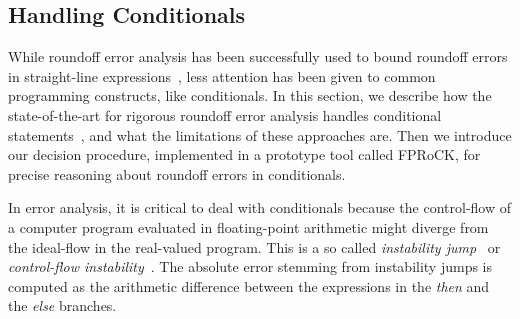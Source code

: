 %
%

%
%
%
%
\subsection{Handling Conditionals}
\label{conditionals}
%
While roundoff error analysis has been successfully used to bound roundoff errors in straight-line expressions~\cite{darulova2018daisy,2015_fm_sjrg,solovyev2018rigorous,rosa,precisa,gappa,fluctuat}, less attention has been given to common programming constructs, like conditionals.
%
In this section, we describe how the state-of-the-art for rigorous roundoff error analysis handles conditional statements~\cite{precisa, fluctuat, darulova2018daisy}, and what the limitations of these approaches are.
%
Then we introduce our decision procedure, implemented in a prototype tool called FPRoCK, for precise reasoning about roundoff errors in conditionals.
%

In error analysis, it is critical to deal with conditionals because the control-flow of a computer program evaluated in floating-point arithmetic might diverge from the ideal-flow in the real-valued program.
%
%
This is a so called \emph{instability jump}~\cite{satire} or \emph{control-flow instability}~\cite{unstable}.
%
The absolute error stemming from instability jumps is computed as the arithmetic difference between the expressions in the \emph{then} and the \emph{else} branches.
%
%

